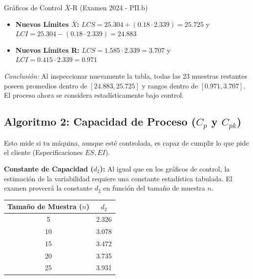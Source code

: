 \begin{ejercicio}{Gráficos de Control $\bar{X}$-R (Examen 2024 - PII.b)}
\begin{enumerate}
\begin{itemize}
        \item \textbf{Nuevos Límites $\bar{X}$:} $LCS = 25.304 + (0.18 \cdot 2.339) = 25.725$ y $LCI = 25.304 - (0.18 \cdot 2.339) = 24.883$
        \item \textbf{Nuevos Límites R:} $LCS = 1.585 \cdot 2.339 = 3.707$ y $LCI = 0.415 \cdot 2.339 = 0.971$
    \end{itemize}
    \textit{Conclusión:} Al inspeccionar nuevamente la tabla, todas las 23 muestras restantes poseen promedios dentro de $[24.883, 25.725]$ y rangos dentro de $[0.971, 3.707]$. El proceso ahora se considera estadísticamente bajo control.
\end{enumerate}
\end{ejercicio}

\subsection{Algoritmo 2: Capacidad de Proceso ($C_p$ y $C_{pk}$)}
Esto mide si tu máquina, aunque esté controlada, es capaz de cumplir lo que pide el cliente (Especificaciones $ES, EI$).

\textbf{Constante de Capacidad ($d_2$):}
Al igual que en los gráficos de control, la estimación de la variabilidad requiere una constante estadística tabulada. El examen proveerá la constante $d_2$ en función del tamaño de muestra $n$.
\begin{center}
\scriptsize
\begin{tabular}{cc}
\toprule
\textbf{Tamaño de Muestra ($n$)} & \textbf{$d_2$} \\
\midrule
5 & 2.326 \\
10 & 3.078 \\
15 & 3.472 \\
20 & 3.735 \\
25 & 3.931 \\
\bottomrule
\end{tabular}
\end{center}

